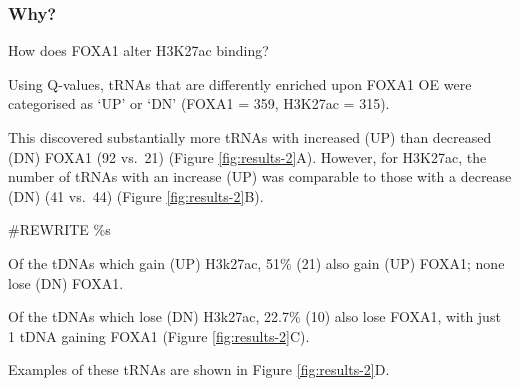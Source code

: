 \documentclass[
  11pt,
]{article}
\begin{document}
\hypertarget{why}{%
\subsubsection{Why?}\label{why}}

How does FOXA1 alter H3K27ac binding?

Using Q-values, tRNAs that are differently enriched upon FOXA1 OE were categorised as `UP' or `DN' (FOXA1 = 359, H3K27ac = 315).

This discovered substantially more tRNAs with increased (UP) than decreased (DN) FOXA1 (92 vs.~21) (Figure \ref{fig:results-2}A).
However, for H3K27ac, the number of tRNAs with an increase (UP) was comparable to those with a decrease (DN) (41 vs.~44) (Figure \ref{fig:results-2}B).

\#REWRITE \%s

Of the tDNAs which gain (UP) H3k27ac, 51\% (21) also gain (UP) FOXA1; none lose (DN) FOXA1.

Of the tDNAs which lose (DN) H3k27ac, 22.7\% (10) also lose FOXA1, with just 1 tDNA gaining FOXA1 (Figure \ref{fig:results-2}C).

Examples of these tRNAs are shown in Figure \ref{fig:results-2}D.

\hypertarget{section}{%
\subsubsection{}\label{section}}
\end{document}
